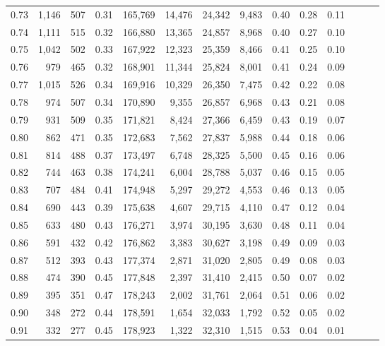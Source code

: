 \begin{tabular}{rrrrrrrrrrrrrr}
0.73 &  1,146 &  507 &  0.31 &  165,769 &   14,476 &  24,342 &   9,483 &  0.40 &  0.28 &      0.11 \\
0.74 &  1,111 &  515 &  0.32 &  166,880 &   13,365 &  24,857 &   8,968 &  0.40 &  0.27 &      0.10 \\
0.75 &  1,042 &  502 &  0.33 &  167,922 &   12,323 &  25,359 &   8,466 &  0.41 &  0.25 &      0.10 \\
0.76 &    979 &  465 &  0.32 &  168,901 &   11,344 &  25,824 &   8,001 &  0.41 &  0.24 &      0.09 \\
0.77 &  1,015 &  526 &  0.34 &  169,916 &   10,329 &  26,350 &   7,475 &  0.42 &  0.22 &      0.08 \\
0.78 &    974 &  507 &  0.34 &  170,890 &    9,355 &  26,857 &   6,968 &  0.43 &  0.21 &      0.08 \\
0.79 &    931 &  509 &  0.35 &  171,821 &    8,424 &  27,366 &   6,459 &  0.43 &  0.19 &      0.07 \\
0.80 &    862 &  471 &  0.35 &  172,683 &    7,562 &  27,837 &   5,988 &  0.44 &  0.18 &      0.06 \\
0.81 &    814 &  488 &  0.37 &  173,497 &    6,748 &  28,325 &   5,500 &  0.45 &  0.16 &      0.06 \\
0.82 &    744 &  463 &  0.38 &  174,241 &    6,004 &  28,788 &   5,037 &  0.46 &  0.15 &      0.05 \\
0.83 &    707 &  484 &  0.41 &  174,948 &    5,297 &  29,272 &   4,553 &  0.46 &  0.13 &      0.05 \\
0.84 &    690 &  443 &  0.39 &  175,638 &    4,607 &  29,715 &   4,110 &  0.47 &  0.12 &      0.04 \\
0.85 &    633 &  480 &  0.43 &  176,271 &    3,974 &  30,195 &   3,630 &  0.48 &  0.11 &      0.04 \\
0.86 &    591 &  432 &  0.42 &  176,862 &    3,383 &  30,627 &   3,198 &  0.49 &  0.09 &      0.03 \\
0.87 &    512 &  393 &  0.43 &  177,374 &    2,871 &  31,020 &   2,805 &  0.49 &  0.08 &      0.03 \\
0.88 &    474 &  390 &  0.45 &  177,848 &    2,397 &  31,410 &   2,415 &  0.50 &  0.07 &      0.02 \\
0.89 &    395 &  351 &  0.47 &  178,243 &    2,002 &  31,761 &   2,064 &  0.51 &  0.06 &      0.02 \\
0.90 &    348 &  272 &  0.44 &  178,591 &    1,654 &  32,033 &   1,792 &  0.52 &  0.05 &      0.02 \\
0.91 &    332 &  277 &  0.45 &  178,923 &    1,322 &  32,310 &   1,515 &  0.53 &  0.04 &      0.01 \\

\end{tabular}
